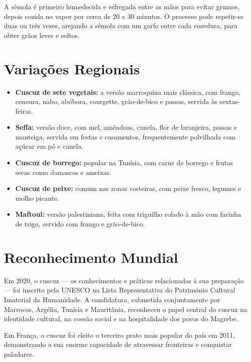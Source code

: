 \documentclass[12pt,a4paper,openright]{book}
\begin{document}
A sêmola é primeiro humedecida e esfregada entre as mãos para evitar grumos, depois cozida no vapor por cerca de 20 a 30 minutos. O processo pode repetir-se duas ou três vezes, arejando a sêmola com um garfo entre cada cozedura, para obter grãos leves e soltos.

\section{Variações Regionais}

\begin{itemize}
    \item \textbf{Cuscuz de sete vegetais:} a versão marroquina mais clássica, com frango, cenoura, nabo, abóbora, courgette, grão-de-bico e passas, servida às sextas-feiras.
    \item \textbf{Seffa:} versão doce, com mel, amêndoas, canela, flor de laranjeira, passas e manteiga, servida em festas e casamentos, frequentemente polvilhada com açúcar em pó e canela.
    \item \textbf{Cuscuz de borrego:} popular na Tunísia, com carne de borrego e frutas secas como damascos e ameixas.
    \item \textbf{Cuscuz de peixe:} comum nas zonas costeiras, com peixe fresco, legumes e molho picante.
    \item \textbf{Maftoul:} versão palestiniana, feita com triguilho rolado à mão com farinha de trigo, servido com frango e grão-de-bico.
\end{itemize}

\section{Reconhecimento Mundial}

Em 2020, o cuscuz --- os conhecimentos e práticas relacionadas à sua preparação --- foi inscrito pela UNESCO na Lista Representativa do Património Cultural Imaterial da Humanidade. A candidatura, submetida conjuntamente por Marrocos, Argélia, Tunísia e Mauritânia, reconheceu o papel central do cuscuz na identidade cultural, na coesão social e na hospitalidade dos povos do Magrebe.

Em França, o cuscuz foi eleito o terceiro prato mais popular do país em 2011, demonstrando a sua enorme capacidade de atravessar fronteiras e conquistar paladares.

\end{document}
